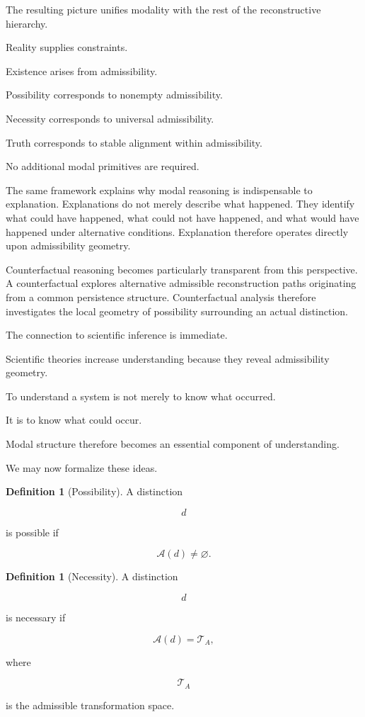 \documentclass[12pt,oneside]{article}
\theoremstyle{definition}
\newtheorem{definition}[theorem]{Definition} \newtheorem{axiom}[theorem]{Axiom} \newtheorem{remark}[theorem]{Remark} \newtheorem{example}[theorem]{Example}
\begin{document}
The resulting picture unifies modality with the rest of the reconstructive hierarchy.

Reality supplies constraints.

Existence arises from admissibility.

Possibility corresponds to nonempty admissibility.

Necessity corresponds to universal admissibility.

Truth corresponds to stable alignment within admissibility.

No additional modal primitives are required.

The same framework explains why modal reasoning is indispensable to explanation. Explanations do not merely describe what happened. They identify what could have happened, what could not have happened, and what would have happened under alternative conditions. Explanation therefore operates directly upon admissibility geometry.

Counterfactual reasoning becomes particularly transparent from this perspective. A counterfactual explores alternative admissible reconstruction paths originating from a common persistence structure. Counterfactual analysis therefore investigates the local geometry of possibility surrounding an actual distinction.

The connection to scientific inference is immediate.

Scientific theories increase understanding because they reveal admissibility geometry.

To understand a system is not merely to know what occurred.

It is to know what could occur.

Modal structure therefore becomes an essential component of understanding.

We may now formalize these ideas.

\begin{definition}[Possibility]

A distinction

\[
d
\]

is possible if

\[
\mathcal A(d)
\neq
\varnothing.
\]

\end{definition}

\begin{definition}[Necessity]

A distinction

\[
d
\]

is necessary if

\[
\mathcal A(d)
=
\mathcal T_A,
\]

where

\[
\mathcal T_A
\]

is the admissible transformation space.

\end{definition}
\end{document}
